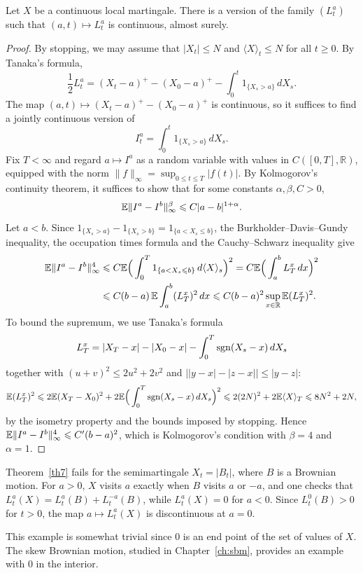 \begin{theorem}\label{th7}
	Let $X$ be a continuous local martingale. There is a version of the
	family $(L^a_t)$ such that $(a,t)\mapsto L^a_t$ is continuous, almost surely.
\end{theorem}

\begin{proof}
	By stopping, we may assume that $|X_t| \leqslant N$ and
	$\langle X\rangle _t\leqslant N$ for all $t\geqslant 0$. By Tanaka's formula,
	\[
		\frac{1}{2}L^a_t=(X_t - a)^{+} -(X_0 - a)^{+}- \int_0^t 1_{\{X_s > a\}}\, dX_s .
	\]
	The map $(a,t)\mapsto (X_t - a)^{+} -(X_0 - a)^{+}$ is continuous, so it
	suffices to find a jointly continuous version of
	\[
		I_t^a = \int_0^t 1_{\{X_s > a\}}\, dX_s .
	\]
	Fix $T<\infty$ and regard $a\mapsto I^a$ as a random variable with values
	in $C([0,T],\mathbb{R})$, equipped with the norm
	$\|f\|_{\infty} =\sup_{0\leqslant t\leqslant T}|f(t)|$. By Kolmogorov's
	continuity theorem, it suffices to show that for some constants
	$\alpha, \beta, C>0$,
	\[
		\mathbb{E}\|I^a- I^b\|_\infty^\beta \leqslant C|a-b|^{1+\alpha}.
	\]
	Let $a<b$. Since $1_{\{X_s > a\}} - 1_{\{X_s > b\}} = 1_{\{a < X_s \leqslant b\}}$,
	the Burkholder--Davis--Gundy inequality, the occupation times formula and
	the Cauchy--Schwarz inequality give
	\begin{align*}
		\mathbb{E}\|I^a- I^b\|_\infty^4 & \leqslant C \mathbb{E}\Big(\int_0^T 1_{\{a< X_s \leqslant b\}}\, d\langle X\rangle_s\Big)^2
		= C\mathbb{E}\Big(\int_a^b L_T^x \, dx\Big)^2                                                                      \\
		                        & \leqslant C(b-a)\, \mathbb{E}\int_a^b (L_T^x)^2\, dx
		\leqslant C(b-a)^2 \sup_{x\in \mathbb{R}} \mathbb{E}(L_T^x)^2 .
	\end{align*}
	To bound the supremum, we use Tanaka's formula
	\[
		L_T^x = |X_T - x| - |X_0 - x| - \int_0^T \operatorname{sgn}( X_s - x)\,dX_s
	\]
	together with $(u+v)^2 \leqslant 2u^2 + 2v^2$ and
	$\big||y-x| -|z-x|\big|\leqslant |y-z|$:
	\[
		\mathbb{E}(L_T^x)^2 \leqslant 2 \mathbb{E}(X_T - X_0)^2 + 2\mathbb{E}\Big( \int_0^T \operatorname{sgn}(X_s-x)\, dX_s \Big)^2
		\leqslant 2(2N)^2 + 2\mathbb{E}\langle X \rangle_T \leqslant 8N^2+2N,
	\]
	by the isometry property and the bounds imposed by stopping. Hence
	$\mathbb{E}\|I^a- I^b\|_\infty^4 \leqslant C' (b-a)^2$, which is Kolmogorov's
	condition with $\beta = 4$ and $\alpha = 1$.
\end{proof}

\begin{example}
	Theorem~\ref{th7} fails for the semimartingale $X_t=|B_t|$, where $B$ is
	a Brownian motion. For $a>0$, $X$ visits $a$ exactly when $B$ visits $a$ or
	$-a$, and one checks that $L^a_t(X)=L^a_t(B)+ L^{-a}_t(B)$, while
	$L^a_t(X)=0$ for $a<0$. Since $L^0_t(B)> 0$ for $t>0$, the map
	$a\mapsto L^a_t(X)$ is discontinuous at $a=0$.

	This example is somewhat trivial since $0$ is an end point of the set of
	values of $X$. The skew Brownian motion, studied in
	Chapter~\ref{ch:sbm}, provides an example with $0$ in the interior.
\end{example}

